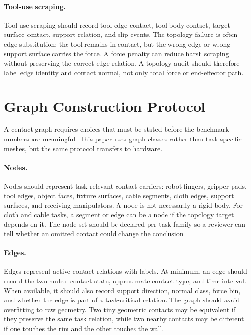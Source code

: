\documentclass{article}
\begin{document}
\paragraph{Tool-use scraping.}
Tool-use scraping should record tool-edge contact, tool-body contact, target-surface contact, support relation, and slip events. The topology failure is often edge substitution: the tool remains in contact, but the wrong edge or wrong support surface carries the force. A force penalty can reduce harsh scraping without preserving the correct edge relation. A topology audit should therefore label edge identity and contact normal, not only total force or end-effector path.

\section{Graph Construction Protocol}

A contact graph requires choices that must be stated before the benchmark numbers are meaningful. This paper uses graph classes rather than task-specific meshes, but the same protocol transfers to hardware.

\paragraph{Nodes.}
Nodes should represent task-relevant contact carriers: robot fingers, gripper pads, tool edges, object faces, fixture surfaces, cable segments, cloth edges, support surfaces, and receiving manipulators. A node is not necessarily a rigid body. For cloth and cable tasks, a segment or edge can be a node if the topology target depends on it. The node set should be declared per task family so a reviewer can tell whether an omitted contact could change the conclusion.

\paragraph{Edges.}
Edges represent active contact relations with labels. At minimum, an edge should record the two nodes, contact state, approximate contact type, and time interval. When available, it should also record support direction, normal class, force bin, and whether the edge is part of a task-critical relation. The graph should avoid overfitting to raw geometry. Two tiny geometric contacts may be equivalent if they preserve the same task relation, while two nearby contacts may be different if one touches the rim and the other touches the wall.
\end{document}
